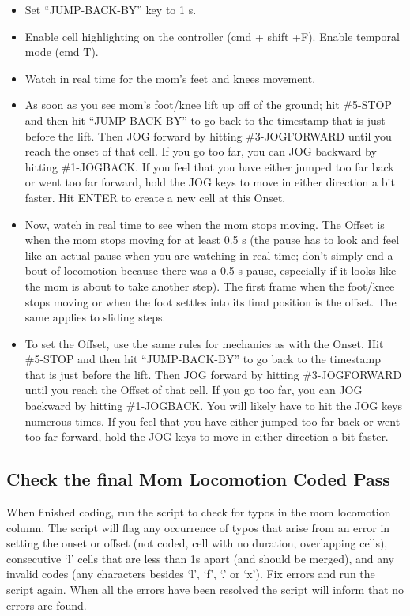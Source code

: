 \documentclass[
  12pt,
]{book}
\providecommand{\tightlist}{%
  \setlength{\itemsep}{0pt}\setlength{\parskip}{0pt}}
\begin{document}
\begin{itemize}
\tightlist
\item
  Set ``JUMP-BACK-BY'' key to 1 s.
\item
  Enable cell highlighting on the controller (cmd + shift +F). Enable temporal mode (cmd T).
\item
  Watch in real time for the mom's feet and knees movement.
\item
  As soon as you see mom's foot/knee lift up off of the ground; hit \#5-STOP and then hit ``JUMP-BACK-BY'' to go back to the timestamp that is just before the lift. Then JOG forward by hitting \#3-JOGFORWARD until you reach the onset of that cell. If you go too far, you can JOG backward by hitting \#1-JOGBACK. If you feel that you have either jumped too far back or went too far forward, hold the JOG keys to move in either direction a bit faster. Hit ENTER to create a new cell at this Onset.
\item
  Now, watch in real time to see when the mom stops moving. The Offset is when the mom stops moving for at least 0.5 s (the pause has to look and feel like an actual pause when you are watching in real time; don't simply end a bout of locomotion because there was a 0.5-s pause, especially if it looks like the mom is about to take another step). The first frame when the foot/knee stops moving or when the foot settles into its final position is the offset. The same applies to sliding steps.
\item
  To set the Offset, use the same rules for mechanics as with the Onset. Hit \#5-STOP and then hit ``JUMP-BACK-BY'' to go back to the timestamp that is just before the lift. Then JOG forward by hitting \#3-JOGFORWARD until you reach the Offset of that cell. If you go too far, you can JOG backward by hitting \#1-JOGBACK. You will likely have to hit the JOG keys numerous times. If you feel that you have either jumped too far back or went too far forward, hold the JOG keys to move in either direction a bit faster.
\end{itemize}

\hypertarget{check-the-final-mom-locomotion-coded-pass}{%
\subsection*{Check the final Mom Locomotion Coded Pass}\label{check-the-final-mom-locomotion-coded-pass}}

When finished coding, run the script to check for typos in the mom locomotion column. The script will flag any occurrence of typos that arise from an error in setting the onset or offset (not coded, cell with no duration, overlapping cells), consecutive `l' cells that are less than 1s apart (and should be merged), and any invalid codes (any characters besides `l', `f', `.' or `x'). Fix errors and run the script again. When all the errors have been resolved the script will inform that no errors are found.
\end{document}
